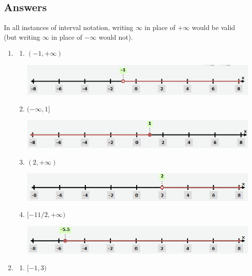 \newpage
\subsection{Answers}

In all instances of interval notation, writing $\infty$ in place of $+\infty$ would be valid (but writing $\infty$ in place of $-\infty$ would not).

\begin{enumerate}
\item \begin{enumerate}
\item $(-1, +\infty)$
\begin{center}
\includegraphics[scale=0.5]{lin-ineq-ans-1a.png}
\end{center}
\item $(-\infty, 1]$
\begin{center}
\includegraphics[scale=0.5]{lin-ineq-ans-1b.png}
\end{center}
\item $(2, +\infty)$
\begin{center}
\includegraphics[scale=0.5]{lin-ineq-ans-1c.png}
\end{center}
\item $[-11/2, +\infty)$
\begin{center}
\includegraphics[scale=0.5]{lin-ineq-ans-1d.png}
\end{center}
\end{enumerate}
\item \begin{enumerate}
\item $[-1,3)$
\begin{center}

\end{center}
\end{enumerate}
\end{enumerate}
